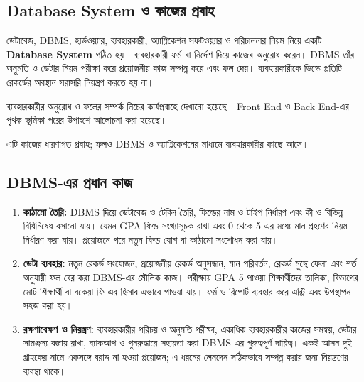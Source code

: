 \subsection{Database System ও কাজের প্রবাহ}
ডেটাবেজ, DBMS, হার্ডওয়্যার, ব্যবহারকারী, অ্যাপ্লিকেশন সফটওয়্যার ও পরিচালনার নিয়ম নিয়ে একটি \textbf{Database System} গঠিত হয়। ব্যবহারকারী ফর্ম বা নির্দেশ দিয়ে কাজের অনুরোধ করেন। DBMS তাঁর অনুমতি ও ডেটার নিয়ম পরীক্ষা করে প্রয়োজনীয় কাজ সম্পন্ন করে এবং ফল দেয়। ব্যবহারকারীকে ডিস্কে প্রতিটি রেকর্ডের অবস্থান সরাসরি নিয়ন্ত্রণ করতে হয় না।

ব্যবহারকারীর অনুরোধ ও ফলের সম্পর্ক নিচের কার্যপ্রবাহে দেখানো হয়েছে। Front End ও Back End-এর পৃথক ভূমিকা পরের উপাংশে আলোচনা করা হয়েছে।


\begin{flushleft}\centering\captionsetup{justification=centering}
\end{flushleft}
এটি কাজের ধারণাগত প্রবাহ; ফলও DBMS ও অ্যাপ্লিকেশনের মাধ্যমে ব্যবহারকারীর কাছে আসে।
\subsection{DBMS-এর প্রধান কাজ}
\begin{enumerate}
\item \textbf{কাঠামো তৈরি:} DBMS দিয়ে ডেটাবেজ ও টেবিল তৈরি, ফিল্ডের নাম ও টাইপ নির্ধারণ এবং কী ও বিভিন্ন বিধিনিষেধ বসানো যায়। যেমন GPA ফিল্ড সংখ্যাসূচক রাখা এবং 0 থেকে 5-এর মধ্যে মান গ্রহণের নিয়ম নির্ধারণ করা যায়। প্রয়োজনে পরে নতুন ফিল্ড যোগ বা কাঠামো সংশোধন করা যায়।
\item \textbf{ডেটা ব্যবহার:} নতুন রেকর্ড সংযোজন, প্রয়োজনীয় রেকর্ড অনুসন্ধান, মান পরিবর্তন, রেকর্ড মুছে ফেলা এবং শর্ত অনুযায়ী ফল বের করা DBMS-এর মৌলিক কাজ। পরীক্ষায় GPA 5 পাওয়া শিক্ষার্থীদের তালিকা, বিভাগের মোট শিক্ষার্থী বা বকেয়া ফি-এর হিসাব এভাবে পাওয়া যায়। ফর্ম ও রিপোর্ট ব্যবহার করে এন্ট্রি এবং উপস্থাপন সহজ করা হয়।
\item \textbf{রক্ষণাবেক্ষণ ও নিয়ন্ত্রণ:} ব্যবহারকারীর পরিচয় ও অনুমতি পরীক্ষা, একাধিক ব্যবহারকারীর কাজের সমন্বয়, ডেটার সামঞ্জস্য বজায় রাখা, ব্যাকআপ ও পুনরুদ্ধারে সহায়তা করা DBMS-এর গুরুত্বপূর্ণ দায়িত্ব। একই আসন দুই গ্রাহকের নামে একসঙ্গে বরাদ্দ না হওয়া প্রয়োজন; এ ধরনের লেনদেন সঠিকভাবে সম্পন্ন করার জন্য নিয়ন্ত্রণের ব্যবস্থা থাকে।
\end{enumerate}

